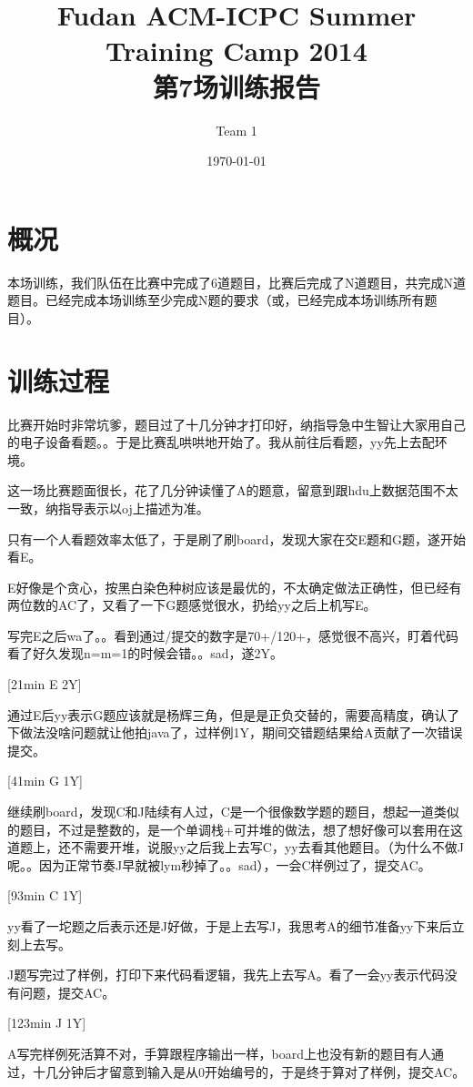 \documentclass[a4paper, 11pt, nofonts, nocap, fancyhdr]{ctexart}
\title{Fudan ACM-ICPC Summer Training Camp 2014\\第7场训练报告}
\author{Team 1}
\date{\today}
\begin{document}
\maketitle

\section{概况}

本场训练，我们队伍在比赛中完成了6道题目，比赛后完成了N道题目，共完成N道题目。已经完成本场训练至少完成N题的要求（或，已经完成本场训练所有题目）。

\section{训练过程}

比赛开始时非常坑爹，题目过了十几分钟才打印好，纳指导急中生智让大家用自己的电子设备看题。。于是比赛乱哄哄地开始了。我从前往后看题，yy先上去配环境。

这一场比赛题面很长，花了几分钟读懂了A的题意，留意到跟hdu上数据范围不太一致，纳指导表示以oj上描述为准。

只有一个人看题效率太低了，于是刷了刷board，发现大家在交E题和G题，遂开始看E。

E好像是个贪心，按黑白染色种树应该是最优的，不太确定做法正确性，但已经有两位数的AC了，又看了一下G题感觉很水，扔给yy之后上机写E。\

写完E之后wa了。。看到通过/提交的数字是70+/120+，感觉很不高兴，盯着代码看了好久发现n=m=1的时候会错。。sad，遂2Y。

[21min E 2Y]

通过E后yy表示G题应该就是杨辉三角，但是是正负交替的，需要高精度，确认了下做法没啥问题就让他拍java了，过样例1Y，期间交错题结果给A贡献了一次错误提交。

[41min G 1Y]

继续刷board，发现C和J陆续有人过，C是一个很像数学题的题目，想起一道类似的题目，不过是整数的，是一个单调栈+可并堆的做法，想了想好像可以套用在这道题上，还不需要开堆，说服yy之后我上去写C，yy去看其他题目。（为什么不做J呢。。因为正常节奏J早就被lym秒掉了。。sad），一会C样例过了，提交AC。

[93min C 1Y]

yy看了一坨题之后表示还是J好做，于是上去写J，我思考A的细节准备yy下来后立刻上去写。

J题写完过了样例，打印下来代码看逻辑，我先上去写A。看了一会yy表示代码没有问题，提交AC。

[123min J 1Y]

A写完样例死活算不对，手算跟程序输出一样，board上也没有新的题目有人通过，十几分钟后才留意到输入是从0开始编号的，于是终于算对了样例，提交AC。
\end{document}
